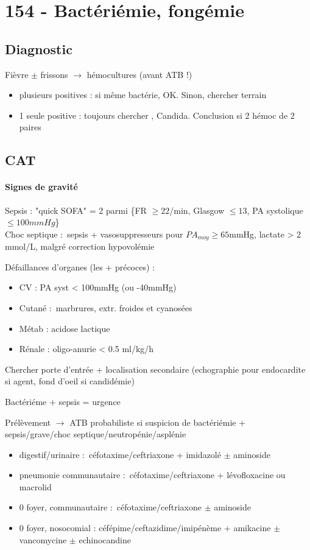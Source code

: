 \section{154 - Bactériémie, fongémie}%
\label{sec:ue_6_154_bacteriemie_fongemie}

\subsection{Diagnostic}%

Fièvre $\pm$ frissons $\rightarrow$ hémocultures (avant ATB !)
\begin{itemize}
  \item plusieurs positives : si même bactérie, OK. Sinon, chercher terrain
  \item 1 seule positive : toujours chercher , Candida. Conclusion si
    2 hémoc de 2 paires
\end{itemize}

\subsection{CAT}%
\label{sub:cat}

\paragraph{Signes de gravité}%
\label{par:signes_de_gravite}
Sepsis : "quick SOFA" = 2 parmi \{FR $\ge 22$/min, Glasgow $\le 13$, PA systolique $\le
100mmHg$\}\\
Choc septique : sepsis + vasosuppresseurs pour $PA_{moy} \ge 65$mmHg, lactate
> 2 mmol/L, malgré correction hypovolémie

Défaillances d'organes (les + précoces) :
\begin{itemize}
  \item CV : PA syst < 100mmHg (ou -40mmHg)
  \item Cutané : marbrures, extr. froides et cyanosées
  \item Métab : acidose lactique
  \item Rénale : oligo-anurie < 0.5 ml/kg/h
\end{itemize}

Chercher porte d'entrée + localisation secondaire (echographie pour endocardite
si agent, fond d'oeil si candidémie)

\danger Bactériéme + sepsis = urgence 

Prélèvement $\rightarrow$ ATB probabiliste si suspicion de bactériémie + sepsis/grave/choc
septique/neutropénie/asplénie
\begin{itemize}
  \item digestif/urinaire : céfotaxime/ceftriaxone + imidazolé $\pm$ aminoside
  \item pneumonie communautaire : céfotaxime/ceftriaxone + lévofloxacine ou macrolid
  \item 0 foyer, communautaire : céfotaxime/ceftriaxone $\pm$ aminoside
  \item 0 foyer, nosocomial : céfépime/ceftazidime/imipénème + amikacine $\pm$
      vancomycine $\pm$ echinocandine
\end{itemize}

